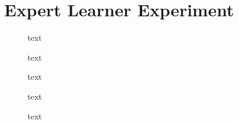 \section{Expert Learner Experiment}

\begin{figure}[h]
	\centering
	
	\caption{text}
\end{figure}

\begin{figure}[h]
	\centering
	
	
	\caption{text}
	
	\vspace*{2cm}
	
	
	\caption{text}
\end{figure}

\begin{figure}[h]
	\centering

	
	\caption{text}
	
	\vspace*{2cm}
	
	
	\caption{text}
\end{figure}